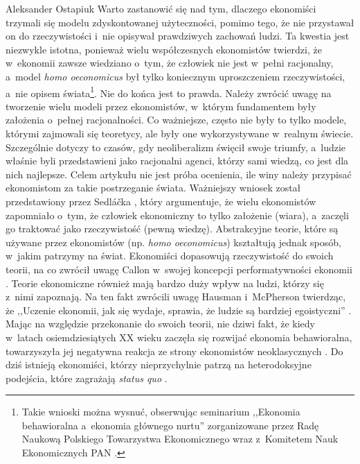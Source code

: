 \begin{artplenv}{Aleksander Ostapiuk}
Warto zastanowić się nad tym, dlaczego ekonomiści trzymali się modelu zdyskontowanej użyteczności, pomimo tego, że nie
przystawał on do rzeczywistości i~nie opisywał prawdziwych zachowań ludzi. Ta kwestia jest niezwykle istotna, ponieważ
wielu współczesnych ekonomistów twierdzi, że w~ekonomii zawsze wiedziano o~tym, że człowiek nie jest w~pełni
racjonalny, a~model \textit{homo oeconomicus} był tylko koniecznym uproszczeniem rzeczywistości, a~nie opisem
świata\footnote{Takie wnioski można wysnuć, obserwując seminarium ,,Ekonomia behawioralna a~ekonomia głównego nurtu''
zorganizowane przez Radę Naukową Polskiego Towarzystwa Ekonomicznego wraz z~Komitetem Nauk Ekonomicznych PAN
\parencite[zob.][]{noauthor_stenogram_2018}.
}. Nie do końca jest to prawda. Należy zwrócić uwagę na tworzenie wielu modeli przez
ekonomistów, w~którym fundamentem były założenia o~pełnej racjonalności. Co ważniejsze, często nie były to tylko modele, którymi
zajmowali się teoretycy, ale były one wykorzystywane w~realnym świecie. Szczególnie dotyczy to czasów, gdy
neoliberalizm święcił swoje triumfy, a~ludzie właśnie byli przedstawieni jako racjonalni agenci, którzy sami wiedzą, co
jest dla nich najlepsze. Celem artykułu nie jest próba ocenienia, ile winy należy przypisać ekonomistom za takie
postrzeganie świata. Ważniejszy wniosek został przedstawiony przez Sedláčka
\parencite*{sedlacek_ekonomia_2012_ost},
który
argumentuje, że wielu ekonomistów zapomniało o~tym, że człowiek ekonomiczny to tylko założenie (wiara), a~zaczęli go
traktować jako rzeczywistość (pewną wiedzę). Abstrakcyjne teorie, które są używane przez ekonomistów (np. \textit{homo
oeconomicus}) kształtują jednak sposób, w~jakim patrzymy na świat. Ekonomiści dopasowują rzeczywistość do swoich teorii,
na co zwrócił uwagę Callon w~swojej koncepcji performatywności ekonomii
\parencites{callon_what_2006}[więcej zob.][]{boldyrev_enacting_2016}.
Teorie ekonomiczne również mają bardzo duży wpływ na ludzi, którzy się z~nimi
zapoznają. Na ten fakt zwrócili uwagę Hausman i~McPherson twierdząc, że ,,Uczenie ekonomii, jak się wydaje, sprawia, że
ludzie są bardziej egoistyczni''
\parencite[s.~674]{hausman_taking_1993}.
Mając na względzie
przekonanie do swoich teorii, nie dziwi fakt, że kiedy w~latach osiemdziesiątych XX wieku zaczęła się rozwijać ekonomia
behawioralna, towarzyszyła jej negatywna reakcja ze strony ekonomistów neoklasycznych
\parencite[zob.][]{thaler_misbehaving:_2015}.
Do dziś istnieją ekonomiści, którzy nieprzychylnie patrzą na heterodoksyjne podejścia, które zagrażają
\textit{status quo}
\parencite[zob.][]{fourcade_superiority_2015,colander_how_2018}.


\end{artplenv}
